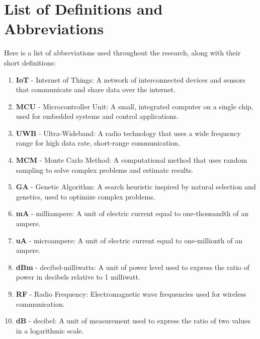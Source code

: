 \chapter{List of Definitions and Abbreviations}\label{chap:additional_chapters}
Here is a list of abbreviations used throughout the research, along with their short definitions:

\vspace{2mm}
\begin{enumerate}
    \item \textbf{IoT} - Internet of Things: A network of interconnected devices and sensors that communicate and share data over the internet.
    \item \textbf{MCU} - Microcontroller Unit: A small, integrated computer on a single chip, used for embedded systems and control applications.
    \item \textbf{UWB} - Ultra-Wideband: A radio technology that uses a wide frequency range for high data rate, short-range communication.
    \item \textbf{MCM} - Monte Carlo Method: A computational method that uses random sampling to solve complex problems and estimate results.
    \item \textbf{GA} - Genetic Algorithm: A search heuristic inspired by natural selection and genetics, used to optimize complex problems.
    \item \textbf{mA} - milliampere: A unit of electric current equal to one-thousandth of an ampere.
    \item \textbf{uA} - microampere: A unit of electric current equal to one-millionth of an ampere.
    \item \textbf{dBm} - decibel-milliwatts: A unit of power level used to express the ratio of power in decibels relative to 1 milliwatt.
    \item \textbf{RF} - Radio Frequency: Electromagnetic wave frequencies used for wireless communication.
    \item \textbf{dB} - decibel: A unit of measurement used to express the ratio of two values in a logarithmic scale.
\end{enumerate}
\vspace{3mm}
